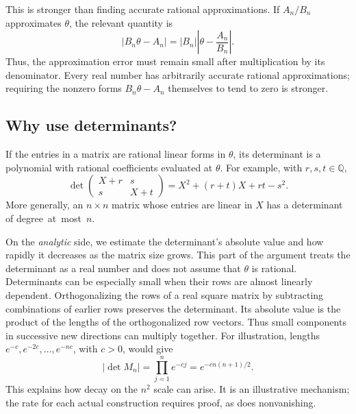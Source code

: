 \documentclass[11pt]{article}
\theoremstyle{definition}
\theoremstyle{remark}
\numberwithin{equation}{section}
\newcommand{\Q}{\mathbb Q}
\begin{document}
This is stronger than finding accurate rational approximations.
If $A_n/B_n$ approximates $\theta$, the relevant quantity is
\[
 |B_n\theta-A_n|=|B_n|\left|\theta-\frac{A_n}{B_n}\right|.
\]
Thus, the approximation error must remain small after multiplication by its
denominator. Every real number has arbitrarily accurate rational
approximations; requiring the nonzero forms $B_n\theta-A_n$ themselves
to tend to zero is stronger.

\subsection{Why use determinants?}

If the entries in a matrix are rational linear forms in $\theta$, its
determinant is a polynomial with rational coefficients evaluated at
$\theta$. For example, with $r,s,t\in\Q$,
\[
 \det\begin{pmatrix}X+r&s\\s&X+t\end{pmatrix}
       =X^2+(r+t)X+rt-s^2.
\]
More generally, an $n\times n$ matrix whose entries are linear in $X$
has a determinant of degree~at~most~$n$.

On the \emph{analytic} side, we estimate the determinant's absolute
value and how rapidly it decreases as the matrix size grows. This
part of the argument treats the determinant as a real number and does
not assume that $\theta$ is rational. Determinants can be especially
small when their rows are almost linearly dependent.
Orthogonalizing the rows of a real
square matrix by subtracting combinations of earlier rows preserves
the determinant. Its absolute value is the product of the lengths of
the orthogonalized row vectors. Thus small components in successive new directions can
multiply together. For illustration, lengths
$e^{-c},e^{-2c},\ldots,e^{-nc}$, with $c>0$, would give
\[
 |\det M_n|=\prod_{j=1}^n e^{-cj}
          =e^{-cn(n+1)/2}.
\]
This explains how decay on the $n^2$ scale can arise. It is an
illustrative mechanism; the rate for each actual construction requires
proof, as does nonvanishing.
\end{document}
